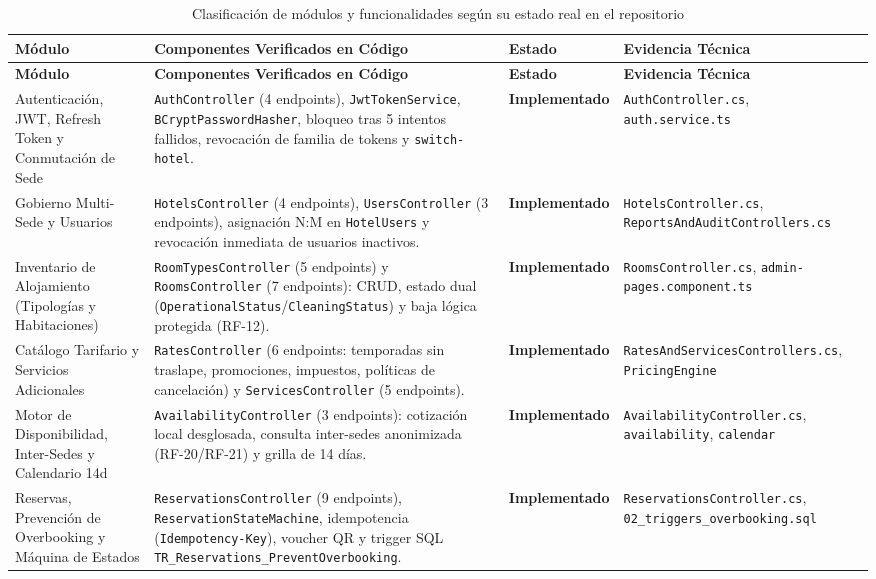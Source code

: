 \documentclass[12pt,a4paper]{article}
\begin{document}
\begin{longtable}{p{3.4cm} p{5.8cm} p{2.3cm} p{3.1cm}}
\caption{Clasificaci\'on de m\'odulos y funcionalidades seg\'un su estado real en el repositorio}
\label{tab:alcance_modulos}\\
\toprule
\textbf{M\'odulo} & \textbf{Componentes Verificados en C\'odigo} & \textbf{Estado} & \textbf{Evidencia T\'ecnica}\\
\midrule
\endfirsthead
\toprule
\textbf{M\'odulo} & \textbf{Componentes Verificados en C\'odigo} & \textbf{Estado} & \textbf{Evidencia T\'ecnica}\\
\midrule
\endhead
\bottomrule
\endfoot
Autenticaci\'on, JWT, Refresh Token y Conmutaci\'on de Sede & \texttt{AuthController} (4 endpoints), \texttt{JwtTokenService}, \texttt{BCryptPasswordHasher}, bloqueo tras 5 intentos fallidos, revocaci\'on de familia de tokens y \texttt{switch-hotel}. & \textbf{Implementado} & \texttt{AuthController.cs}, \texttt{auth.service.ts}\\[0.15cm]
Gobierno Multi-Sede y Usuarios & \texttt{HotelsController} (4 endpoints), \texttt{UsersController} (3 endpoints), asignaci\'on N:M en \texttt{HotelUsers} y revocaci\'on inmediata de usuarios inactivos. & \textbf{Implementado} & \texttt{HotelsController.cs}, \texttt{ReportsAndAuditControllers.cs}\\[0.15cm]
Inventario de Alojamiento (Tipolog\'ias y Habitaciones) & \texttt{RoomTypesController} (5 endpoints) y \texttt{RoomsController} (7 endpoints): CRUD, estado dual (\texttt{OperationalStatus}/\texttt{CleaningStatus}) y baja l\'ogica protegida (RF-12). & \textbf{Implementado} & \texttt{RoomsController.cs}, \texttt{admin-pages.component.ts}\\[0.15cm]
Cat\'alogo Tarifario y Servicios Adicionales & \texttt{RatesController} (6 endpoints: temporadas sin traslape, promociones, impuestos, pol\'iticas de cancelaci\'on) y \texttt{ServicesController} (5 endpoints). & \textbf{Implementado} & \texttt{RatesAndServicesControllers.cs}, \texttt{PricingEngine}\\[0.15cm]
Motor de Disponibilidad, Inter-Sedes y Calendario 14d & \texttt{AvailabilityController} (3 endpoints): cotizaci\'on local desglosada, consulta inter-sedes anonimizada (RF-20/RF-21) y grilla de 14 d\'ias. & \textbf{Implementado} & \texttt{AvailabilityController.cs}, \texttt{availability}, \texttt{calendar}\\[0.15cm]
Reservas, Prevenci\'on de Overbooking y M\'aquina de Estados & \texttt{ReservationsController} (9 endpoints), \texttt{ReservationStateMachine}, idempotencia (\texttt{Idempotency-Key}), voucher QR y trigger SQL \texttt{TR\_Reservations\_PreventOverbooking}. & \textbf{Implementado} & \texttt{ReservationsController.cs}, \texttt{02\_triggers\_overbooking.sql}\\[0.15cm]

\end{longtable}
\end{document}
